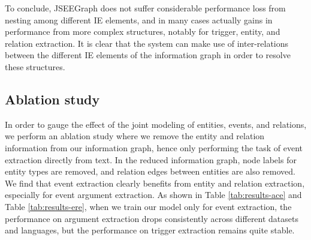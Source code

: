 \documentclass[11pt]{article}
\begin{document}
To conclude, JSEEGraph does not suffer considerable performance loss from nesting among different IE elements, and in many cases actually gains in performance from more complex structures, notably for trigger, entity, and relation extraction. It is clear that the system can make use of inter-relations between the different IE elements of the information graph in order to resolve these structures.

\subsection{Ablation study}
In order to gauge the effect of the joint modeling of entities, events, and relations, we perform an ablation study where we remove the entity and relation information from our information graph, hence only performing the task of event extraction directly from text. In the reduced information graph, node labels for entity types are removed, and relation edges between entities are also removed. We find that event extraction clearly benefits from entity and relation extraction, especially for event argument extraction. As shown in Table \ref{tab:results-ace} and Table \ref{tab:results-ere}, when we train our model only for event extraction, the performance on argument extraction drops consistently across different datasets and languages, but the performance on trigger extraction remains quite stable.
\end{document}
